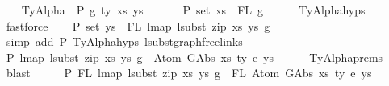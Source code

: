 \begin{isabellebody}
\isamarkupfalse%
\isanewline
\ \ \isamarkupfalse%
\ {\isacharparenleft}{\kern0pt}TyAlpha\ {\isasymGamma}{}{\isacharprime}{\kern0pt}\ P\ g\ ty{\isacharprime}{\kern0pt}\ xs{\isacharprime}{\kern0pt}\ ys{\isacharprime}{\kern0pt}{\isacharparenright}{\kern0pt}\isanewline
\ \ \isanewline
\ \ \isamarkupfalse%
\ P{}{\isacharcolon}{\kern0pt}\ {\isachardoublequoteopen}set\ xs{\isacharprime}{\kern0pt}\ {\isacharequal}{\kern0pt}\ FL\ g{\isachardoublequoteclose}\isanewline
\ \ \ \ \isamarkupfalse%
\ TyAlpha{\isachardot}{\kern0pt}hyps{\isacharparenleft}{\kern0pt}{}{\isacharparenright}{\kern0pt}\ \isamarkupfalse%
\ fastforce\isanewline
\ \ \isamarkupfalse%
\ P{}{\isacharcolon}{\kern0pt}\ {\isachardoublequoteopen}set\ ys{\isacharprime}{\kern0pt}\ {\isacharequal}{\kern0pt}\ FL\ {\isacharparenleft}{\kern0pt}lmap\ {\isacharparenleft}{\kern0pt}lsubst\ {\isacharparenleft}{\kern0pt}zip\ xs{\isacharprime}{\kern0pt}\ ys{\isacharprime}{\kern0pt}{\isacharparenright}{\kern0pt}{\isacharparenright}{\kern0pt}\ g{\isacharparenright}{\kern0pt}{\isachardoublequoteclose}\isanewline
\ \ \ \ \isamarkupfalse%
\ {\isacharparenleft}{\kern0pt}simp\ add{\isacharcolon}{\kern0pt}\ P{}\ TyAlpha{\isachardot}{\kern0pt}hyps{\isacharparenleft}{\kern0pt}{}{\isacharcomma}{\kern0pt}{}{\isacharparenright}{\kern0pt}\ lsubst{\isacharunderscore}{\kern0pt}graph{\isacharunderscore}{\kern0pt}freelinks{\isacharparenright}{\kern0pt}\isanewline
\ \ \isamarkupfalse%
\ P{}{\isacharcolon}{\kern0pt}\ {\isachardoublequoteopen}lmap\ {\isacharparenleft}{\kern0pt}lsubst\ {\isacharparenleft}{\kern0pt}zip\ xs{\isacharprime}{\kern0pt}\ ys{\isacharprime}{\kern0pt}{\isacharparenright}{\kern0pt}{\isacharparenright}{\kern0pt}\ g\ {\isasymsimeq}\ Atom\ {\isacharparenleft}{\kern0pt}GAbs\ xs\ ty{}{\isacharprime}{\kern0pt}\ e{\isacharparenright}{\kern0pt}\ ys{\isachardoublequoteclose}\isanewline
\ \ \ \ \isamarkupfalse%
\ TyAlpha{\isachardot}{\kern0pt}prems\ \isamarkupfalse%
\ blast\isanewline
\ \ \isamarkupfalse%
\ \isamarkupfalse%
\ P{}{\isacharcolon}{\kern0pt}\ {\isachardoublequoteopen}FL\ {\isacharparenleft}{\kern0pt}lmap\ {\isacharparenleft}{\kern0pt}lsubst\ {\isacharparenleft}{\kern0pt}zip\ xs{\isacharprime}{\kern0pt}\ ys{\isacharprime}{\kern0pt}{\isacharparenright}{\kern0pt}{\isacharparenright}{\kern0pt}\ g{\isacharparenright}{\kern0pt}\ {\isacharequal}{\kern0pt}\ FL\ {\isacharparenleft}{\kern0pt}Atom\ {\isacharparenleft}{\kern0pt}GAbs\ xs\ ty{}{\isacharprime}{\kern0pt}\ e{\isacharparenright}{\kern0pt}\ ys{\isacharparenright}{\kern0pt}{\isachardoublequoteclose}\isanewline

\end{isabellebody}

